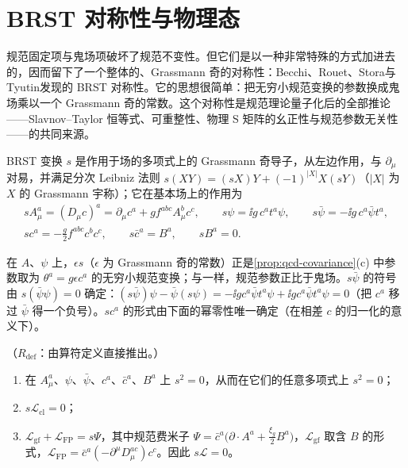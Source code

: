 \section{BRST 对称性与物理态}\label{sec:prelim-brst}

规范固定项与鬼场项破坏了规范不变性。但它们是以一种非常特殊的方式加进去的，因而留下了一个整体的、Grassmann 奇的对称性：Becchi、Rouet、Stora\cite{BecchiRouetStora1975,BecchiRouetStora1976}与 Tyutin\cite{Tyutin1975}发现的 BRST 对称性。它的思想很简单：把无穷小规范变换的参数换成鬼场乘以一个 Grassmann 奇的常数。这个对称性是规范理论量子化后的全部推论——Slavnov--Taylor 恒等式、可重整性、物理 S 矩阵的幺正性与规范参数无关性——的共同来源。

\begin{definition}[BRST 变换]\label{def:prelim-brst}
BRST 变换 $s$ 是作用于场的多项式上的 Grassmann 奇导子，从左边作用，与 $\partial_\mu$ 对易，并满足分次 Leibniz 法则 $s(XY)=(sX)Y+(-1)^{|X|}X(sY)$（$|X|$ 为 $X$ 的 Grassmann 宇称）；它在基本场上的作用为
\begin{equation}\label{eq:qcd-brst}
\begin{gathered}
sA^a_\mu=(D_\mu c)^a=\partial_\mu c^a+gf^{abc}A^b_\mu c^c,\qquad s\psi=\ii g\,c^at^a\psi,\qquad s\bar\psi=-\ii g\,c^a\bar\psi t^a,\\
sc^a=-\frac g2f^{abc}c^bc^c,\qquad s\bar c^a=B^a,\qquad sB^a=0 .
\end{gathered}
\end{equation}
\end{definition}

在 $A$、$\psi$ 上，$\epsilon s$（$\epsilon$ 为 Grassmann 奇的常数）正是\cref{prop:qcd-covariance}(c) 中参数取为 $\theta^a=g\epsilon c^a$ 的无穷小规范变换；与\cite[第~16.4~节]{PeskinSchroeder1995}一样，规范参数正比于鬼场。$s\bar\psi$ 的符号由 $s(\bar\psi\psi)=0$ 确定：$(s\bar\psi)\psi-\bar\psi(s\psi)=-\ii gc^a\bar\psi t^a\psi+\ii gc^a\bar\psi t^a\psi=0$（把 $c^a$ 移过 $\bar\psi$ 得一个负号）。$sc^a$ 的形式由下面的幂零性唯一确定（在相差 $c$ 的归一化的意义下）。

\begin{lemma}[$s^2=0$ 与拉氏量的 BRST 不变性 \tagR]\label{lem:prelim-brst-nilpotent}
（$R_{\mathrm{def}}$：由算符定义直接推出。）
\begin{enumerate}[label=(\alph*),leftmargin=2.2em,itemsep=1pt,topsep=2pt]
\item 在 $A^a_\mu$、$\psi$、$\bar\psi$、$c^a$、$\bar c^a$、$B^a$ 上 $s^2=0$，从而在它们的任意多项式上 $s^2=0$；
\item $s\mathcal L_{\mathrm{cl}}=0$；
\item $\mathcal L_{\mathrm{gf}}+\mathcal L_{\mathrm{FP}}=s\Psi$，其中规范费米子 $\Psi=\bar c^a\big(\partial\cdot A^a+\frac{\xi_g}2B^a\big)$，$\mathcal L_{\mathrm{gf}}$ 取含 $B$ 的形式，$\mathcal L_{\mathrm{FP}}=\bar c^a(-\partial^\mu D^{ac}_\mu)c^c$。因此 $s\mathcal L=0$。
\end{enumerate}
\end{lemma}

